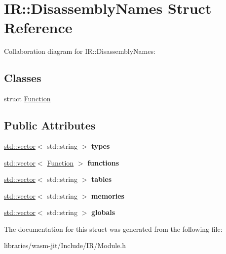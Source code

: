 \hypertarget{struct_i_r_1_1_disassembly_names}{}\section{IR\+:\+:Disassembly\+Names Struct Reference}
\label{struct_i_r_1_1_disassembly_names}


Collaboration diagram for IR\+:\+:Disassembly\+Names\+:
\subsection*{Classes}
\begin{DoxyCompactItemize}
\item 
struct \mbox{\hyperlink{struct_i_r_1_1_disassembly_names_1_1_function}{Function}}
\end{DoxyCompactItemize}
\subsection*{Public Attributes}
\begin{DoxyCompactItemize}
\item 
\mbox{\label{struct_i_r_1_1_disassembly_names_ab055b4c06d151f507db3183beddebbe1}} 
\mbox{\hyperlink{classstd_1_1vector}{std\+::vector}}$<$ std\+::string $>$ {\bfseries types}
\item 
\mbox{\label{struct_i_r_1_1_disassembly_names_ae7545a8574581eb0cc0ee946516db404}} 
\mbox{\hyperlink{classstd_1_1vector}{std\+::vector}}$<$ \mbox{\hyperlink{struct_i_r_1_1_disassembly_names_1_1_function}{Function}} $>$ {\bfseries functions}
\item 
\mbox{\label{struct_i_r_1_1_disassembly_names_a7741fd4de1b8e40f08d769230384d2c8}} 
\mbox{\hyperlink{classstd_1_1vector}{std\+::vector}}$<$ std\+::string $>$ {\bfseries tables}
\item 
\mbox{\label{struct_i_r_1_1_disassembly_names_a15e70ee713e6ddf2c9c3105c733a392a}} 
\mbox{\hyperlink{classstd_1_1vector}{std\+::vector}}$<$ std\+::string $>$ {\bfseries memories}
\item 
\mbox{\label{struct_i_r_1_1_disassembly_names_a4516c9cf9ae1e817ff4be289d30d9b43}} 
\mbox{\hyperlink{classstd_1_1vector}{std\+::vector}}$<$ std\+::string $>$ {\bfseries globals}
\end{DoxyCompactItemize}


The documentation for this struct was generated from the following file\+:\begin{DoxyCompactItemize}
\item 
libraries/wasm-\/jit/\+Include/\+I\+R/Module.\+h\end{DoxyCompactItemize}
